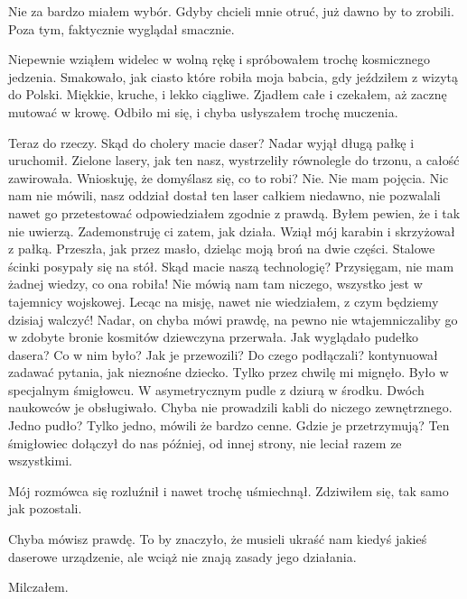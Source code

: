Nie za bardzo miałem wybór. 
Gdyby chcieli mnie otruć, już dawno by to zrobili.
Poza tym, faktycznie wyglądał smacznie.

Niepewnie wziąłem widelec w wolną rękę i spróbowałem trochę kosmicznego jedzenia.
Smakowało, jak ciasto które robiła moja babcia, gdy jeździłem z wizytą do Polski.
Miękkie, kruche, i lekko ciągliwe.
Zjadłem całe i czekałem, aż zacznę mutować w krowę.
Odbiło mi się, i chyba usłyszałem trochę muczenia.

\begin{dialogue}
\ds{} Teraz do rzeczy. Skąd do cholery macie daser? \dm{} Nadar wyjął długą pałkę i uruchomił. Zielone lasery, jak ten nasz, wystrzeliły równolegle do trzonu, a całość zawirowała.
\dm{} Wnioskuję, że domyślasz się, co to robi?
\ds{} Nie. Nie mam pojęcia. Nic nam nie mówili, nasz oddział dostał ten laser całkiem niedawno, nie pozwalali nawet go przetestować \dm{} odpowiedziałem zgodnie z prawdą. 
Byłem pewien, że i tak nie uwierzą.
\ds{} Zademonstruję ci zatem, jak działa. \dm{} Wziął mój karabin i skrzyżował z pałką. 
Przeszła, jak przez masło, dzieląc moją broń na dwie części. Stalowe ścinki posypały się na stół. \dm{} Skąd macie naszą technologię?
\ds{} Przysięgam, nie mam żadnej wiedzy, co ona robiła! Nie mówią nam tam niczego, wszystko jest w tajemnicy wojskowej. 
Lecąc na misję, nawet nie wiedziałem, z czym będziemy dzisiaj walczyć!
\ds{} Nadar, on chyba mówi prawdę, na pewno nie wtajemniczaliby go w zdobyte bronie kosmitów \dm{} dziewczyna przerwała.
\ds{} Jak wyglądało pudełko dasera? Co w nim było? Jak je przewozili? Do czego podłączali? \dm{} kontynuował zadawać pytania, jak nieznośne dziecko.
\ds{} Tylko przez chwilę mi mignęło. Było w specjalnym śmigłowcu. W asymetrycznym pudle z dziurą w środku. Dwóch naukowców je obsługiwało. Chyba nie prowadzili kabli do niczego zewnętrznego.
\ds{} Jedno pudło?
\ds{} Tylko jedno, mówili że bardzo cenne.
\ds{} Gdzie je przetrzymują?
\ds{} Ten śmigłowiec dołączył do nas później, od innej strony, nie leciał razem ze wszystkimi.
\end{dialogue}

Mój rozmówca się rozluźnił i nawet trochę uśmiechnął.
Zdziwiłem się, tak samo jak pozostali.

\begin{dialogue}
\ds{} Chyba mówisz prawdę. To by znaczyło, że musieli ukraść nam kiedyś jakieś daserowe urządzenie, ale wciąż nie znają zasady jego działania.
\end{dialogue}

Milczałem.

